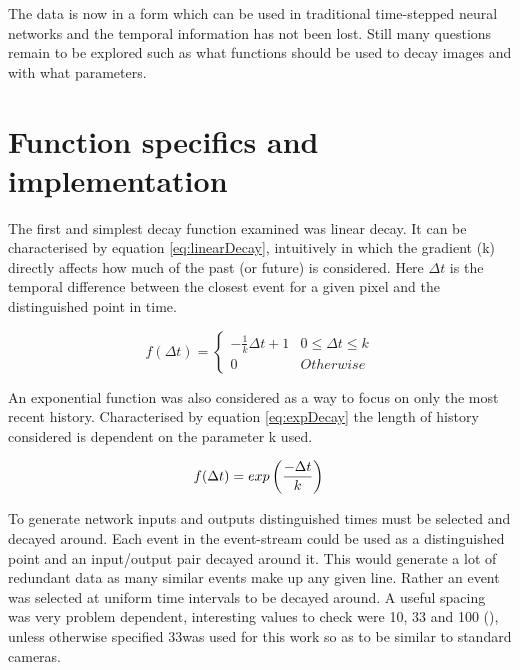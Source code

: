 The data is now in a form which can be used in traditional time-stepped neural networks and the temporal information has not been lost.
Still many questions remain to be explored such as what functions should be used to decay images and with what parameters.


\section{Function specifics and implementation}

The first and simplest decay function examined was linear decay. 
It can be characterised by equation \ref{eq:linearDecay}, intuitively in which the gradient (k) directly affects how much of the past (or future) is considered. 
Here $\Delta t$ is the temporal difference between the closest event for a given pixel and the distinguished point in time. 


\begin{equation}
 \label{eq:linearDecay}
    f(\Delta t) = 
    \begin{cases}
    -\frac{1}{k}  \Delta t + 1 & 0\leq \Delta t \leq k \\
    0 & Otherwise
   \end{cases}
\end{equation}

An exponential function was also considered as a way to focus on only the most recent history.
Characterised by equation \ref{eq:expDecay} the length of history considered is dependent on the parameter k used. 

\begin{equation}
 \label{eq:expDecay}
    f(\Delta t) = exp\left(\frac{-\Delta t}{k}\right) \\
\end{equation}

To generate network inputs and outputs distinguished times must be selected and decayed around.
Each event in the event-stream could be used as a distinguished point and an input/output pair decayed around it.
This would generate a lot of redundant data as many similar events make up any given line.
Rather an event was selected at uniform time intervals to be decayed around.
A useful spacing was very problem dependent, interesting values to check were 10, 33 and 100 (\ms), unless otherwise specified 33\ms was used for this work so as to be similar to standard cameras. 

